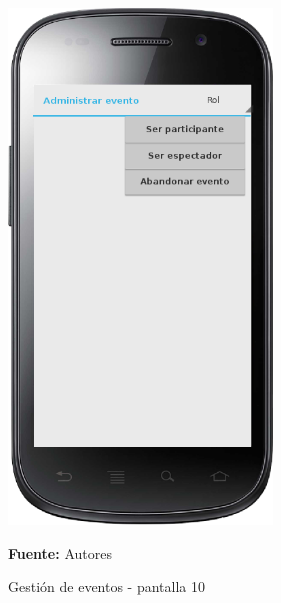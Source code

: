 \begin{figure}[!htb]
  \begin{center}
    \includegraphics[width=7cm]{./imagenes/UI/Eventos/gestion_eventos_10.png}
    \caption{Gestión de eventos - pantalla 10}
    \label{fig:gestion_eventos_10}
    \textbf{Fuente:}  Autores
  \end{center}
\end{figure}